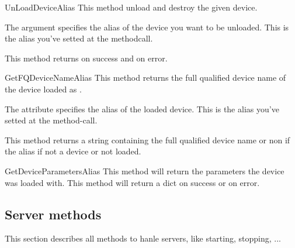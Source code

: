 \begin{methoddesc}[System]{UnLoadDevice}{Alias}
This method unload and destroy the given device. 

The argument  specifies the alias of the device you want to be
unloaded. This is the alias you've setted at the  
methodcall.

This method returns  on success and  on error.
\end{methoddesc}


\begin{methoddesc}[System]{GetFQDeviceName}{Alias}
This method returns the full qualified device name of the device loaded as
.

The attribute  specifies the alias of the loaded device. This is
the alias you've setted at the  method-call.

This method returns a string containing the full qualified device name or non 
if the alias if not a device or not loaded.
\end{methoddesc}


\begin{methoddesc}[System]{GetDeviceParameters}{Alias}
This method will return the parameters the device was loaded with. This method
will return a dict on success or  on error.
\end{methoddesc}


\subsection{Server methods}
This section describes all methods to hanle servers, like starting, stopping, ... 

